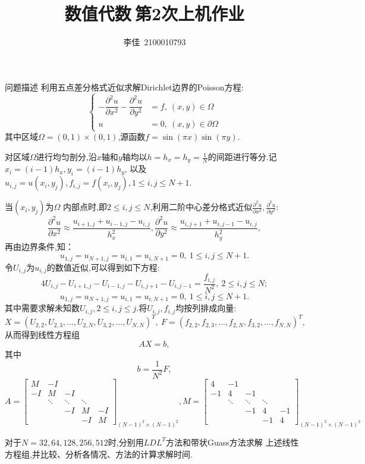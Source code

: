 \documentclass{article}
\title{数值代数$\ $第2次上机作业}
\author{李佳~2100010793}
\date{}
\begin{document}
\maketitle
\begin{section}{问题描述}
    利用五点差分格式近似求解Dirichlet边界的Poisson方程:
    $$\left\{\begin{aligned}
        -\dfrac{\partial^2u}{\partial x^2}-\dfrac{\partial^2u}{\partial y^2} &= f,\ (x,y)\in\Omega\\
        u &= 0,\ (x,y)\in \partial \Omega
    \end{aligned}\right.$$
    其中区域$\Omega=(0,1)\times(0,1)$,源函数$f = \sin(\pi x)\sin(\pi y)$.
    
    对区域$\Omega$进行均匀剖分,沿$x$轴和$y$轴均以$h = h_x=h_y=\frac{1}{N}$的间距进行等分.记$x_i = (i-1)h_x,y_i = (i-1)h_y$,
    以及$u_{i,j} = u(x_i,y_j),f_{i,j} = f(x_i,y_j),1\leq i,j\leq N+1.$

    当$(x_i,y_j)$为$\Omega$ 内部点时,即$2\leq i,j\leq N$,利用二阶中心差分格式近似$\frac{\partial^2u}{\partial x^2},\frac{\partial^2u}{\partial y^2}:$
    $$\dfrac{\partial^2u}{\partial x^2}\approx \dfrac{u_{i+1,j}+u_{i-1,j}-u_{i,j}}{h_x^2},\dfrac{\partial^2u}{\partial y^2}\approx \dfrac{u_{i,j+1}+u_{i,j-1}-u_{i,j}}{h_y^2},$$
    再由边界条件,知：$$u_{1,j}= u_{N+1,j}=u_{i,1}=u_{i,N+1}= 0,\ 1\leq i,j\leq N+1.$$
    令$U_{i,j}$为$u_{i,j}$的数值近似,可以得到如下方程:
    $$ 4U_{i,j}-U_{i+1,j}-U_{i-1,j}-U_{i,j+1}-U_{i,j-1} = \dfrac{f_{i,j}}{N^2},\ 2\leq i,j\leq N;$$
    $$u_{1,j}= u_{N+1,j}=u_{i,1}=u_{i,N+1}= 0,\ 1\leq i,j\leq N+1.$$
    其中需要求解未知数$U_{i,j},2\leq i,j\leq j$.将$U_{i,j},f_{i,j}$均按列排成向量:
    $$ X = (U_{2,2},U_{2,3},...,U_{2,N},U_{3,2},...,U_{N,N})^T,\ 
    F = (f_{2,2},f_{2,3},...,f_{2,N},f_{3,2},...,f_{N,N})^T,$$
    从而得到线性方程组$$AX=b,$$
    其中$$b = \dfrac{1}{N^2}F,$$
    $$A=\begin{bmatrix}
        M & -I & & &\\
        -I & M & -I & &\\
          & \ddots &\ddots& \ddots & \\
          &  & -I & M & -I\\
          &  &  & -I & M
    \end{bmatrix}_{(N-1)^2\times (N-1)^2},
    M=\begin{bmatrix}
        4 & -1 & & &\\
        -1 & 4 & -1 & &\\
          & \ddots &\ddots& \ddots & \\
          &  & -1 & 4 & -1\\
          &  &  & -1 & 4
    \end{bmatrix}_{(N-1)^2\times (N-1)^2}$$

    对于$N=32,64,128,256,512$时,分别用$LDL^T$方法和带状Guass方法求解
    上述线性方程组,并比较、分析各情况、方法的计算求解时间.
\end{section}
\end{document}
